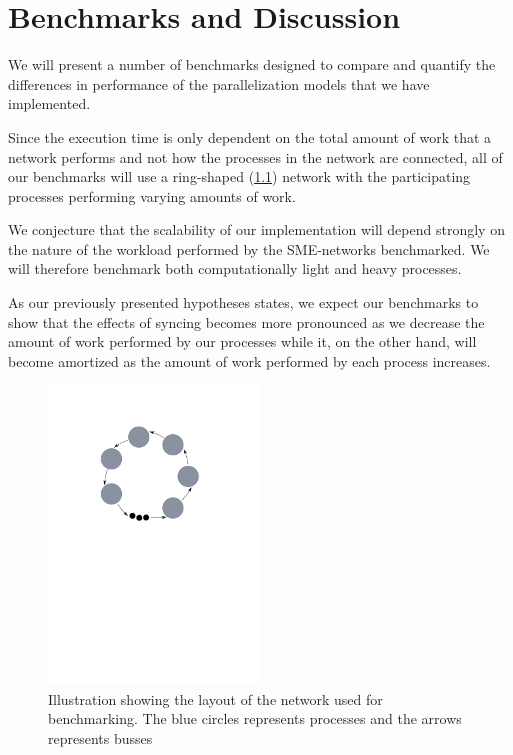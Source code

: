 \chapter{Benchmarks and Discussion}

We will present a number of benchmarks designed to compare and
quantify the differences in performance of the parallelization models
that we have implemented.

Since the execution time is only dependent on the total amount of work
that a network performs and not how the processes in the network are
connected, all of our benchmarks will use a ring-shaped
(\cref{fig:benchnetwork}) network with the participating processes
performing varying amounts of work.

We conjecture that the scalability of our implementation will depend
strongly on the nature of the workload performed by the SME-networks
benchmarked. We will therefore benchmark both computationally light
and heavy processes.

As our previously presented hypotheses states, we expect our
benchmarks to show that the effects of syncing becomes more pronounced
as we decrease the amount of work performed by our processes while it,
on the other hand, will become amortized as the amount of work
performed by each process increases.

\begin{figure}
\centering
\includegraphics[width=0.5\textwidth]{figures/ring}
\caption[SME network used for benchmarking]{Illustration showing the
  layout of the network used for benchmarking. The blue circles
  represents processes and the arrows represents busses}
\label{fig:benchnetwork}
\end{figure}


